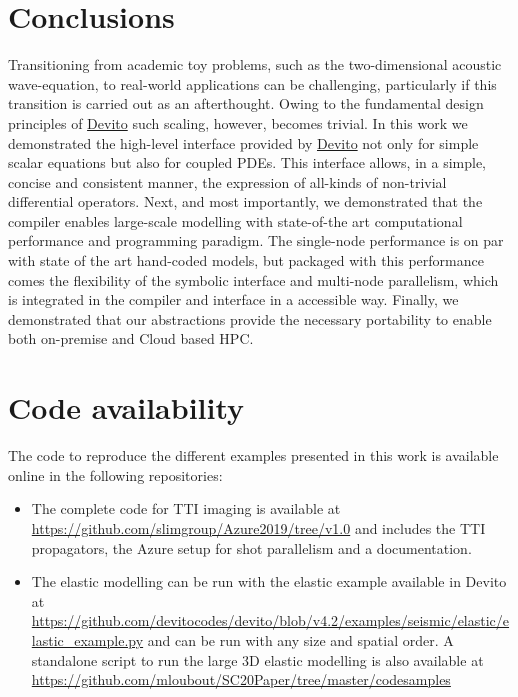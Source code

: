 \documentclass[10pt, conference]{IEEEtran}
\newcommand{\devito}{\href{https://github.com/devitocodes/devito}{Devito} }
\begin{document}
\section{Conclusions}\label{conclusions}

Transitioning from academic toy problems, such as the two-dimensional
acoustic wave-equation, to real-world applications can be challenging,
particularly if this transition is carried out as an afterthought.
Owing to the fundamental design principles of \devito such scaling,
however, becomes trivial. In this work we demonstrated
the high-level interface provided by \devito not only for simple scalar
equations but also for coupled PDEs. This interface allows, in a simple, concise
and consistent manner, the expression of all-kinds of non-trivial
differential operators. Next, and most
importantly, we demonstrated that the compiler enables large-scale modelling with
state-of-the art computational performance and programming paradigm. The
single-node performance is on par with state of the art hand-coded models, but
packaged with this performance comes
the flexibility of the symbolic interface and multi-node parallelism, which is
integrated in the compiler and interface in a accessible way. Finally,
we demonstrated that our abstractions provide the necessary portability
to enable both on-premise and Cloud based HPC.


\section{Code availability}

The code to reproduce the different examples presented in this work is available online in the following repositories:

\begin{itemize}
  \item The complete code for TTI imaging is available at \url{https://github.com/slimgroup/Azure2019/tree/v1.0} and includes 
  the TTI propagators, the Azure setup for shot parallelism and a documentation.
  \item The elastic modelling can be run with the elastic example available in Devito at
  \url{https://github.com/devitocodes/devito/blob/v4.2/examples/seismic/elastic/elastic_example.py} 
  and can be run with any size and spatial order. A standalone script to run the large 3D elastic modelling
  is also available at \url{https://github.com/mloubout/SC20Paper/tree/master/codesamples}
\end{itemize}


\end{document}
